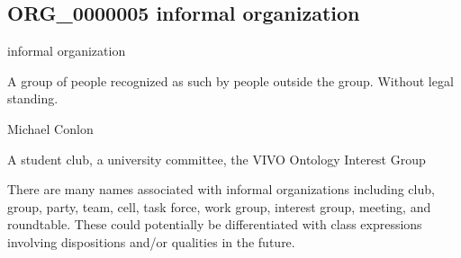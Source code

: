 \documentclass[letterpaper,10pt,english]{sphinxmanual}
\begin{document}
\subsection{ORG\_0000005 \sphinxhyphen{} informal organization}
\label{\detokenize{doc-ORG_0000005:org-0000005-informal-organization}}\label{\detokenize{doc-ORG_0000005:index-0}}\label{\detokenize{doc-ORG_0000005::doc}}
\begin{sphinxShadowBox}

\sphinxAtStartPar
informal organization
\end{sphinxShadowBox}

\begin{sphinxShadowBox}

\sphinxAtStartPar
{\hyperref[\detokenize{doc-ORG_0000001::doc}]{}}
\end{sphinxShadowBox}

\begin{sphinxShadowBox}

\sphinxAtStartPar
A group of people recognized as such by people outside the group. Without legal standing.
\end{sphinxShadowBox}

\begin{sphinxShadowBox}

\sphinxAtStartPar
Michael Conlon 
\end{sphinxShadowBox}

\begin{sphinxShadowBox}

\sphinxAtStartPar
A student club, a university committee, the VIVO Ontology Interest Group
\end{sphinxShadowBox}

\begin{sphinxShadowBox}

\sphinxAtStartPar
There are many names associated with informal organizations including club, group, party, team, cell, task force, work group, interest group, meeting, and roundtable.  These could potentially be differentiated with class expressions involving dispositions and/or qualities in the future.
\end{sphinxShadowBox}
\end{document}
